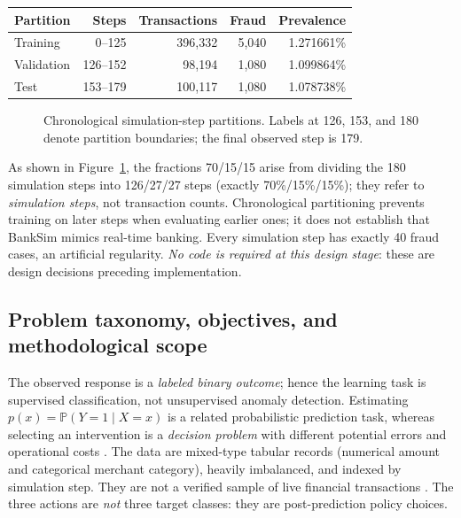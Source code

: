 \documentclass[11pt,a4paper]{article}
\begin{document}
\begin{center}\begin{tabular}{lrrrr}\toprule
Partition & Steps & Transactions & Fraud & Prevalence\\\midrule
Training & 0--125 & 396,332 & 5,040 & 1.271661\%\\
Validation & 126--152 & 98,194 & 1,080 & 1.099864\%\\
Test & 153--179 & 100,117 & 1,080 & 1.078738\%\\\bottomrule
\end{tabular}\end{center}
\begin{figure}[H]\centering
{}
\caption{Chronological simulation-step partitions. Labels at 126, 153, and 180 denote partition boundaries; the final observed step is 179.}\label{fig:timeline}\end{figure}
As shown in Figure~\ref{fig:timeline}, the fractions 70/15/15 arise from dividing the 180 simulation steps into 126/27/27 steps (exactly 70\%/15\%/15\%); they refer to \emph{simulation steps}, not transaction counts. Chronological partitioning prevents training on later steps when evaluating earlier ones; it does not establish that BankSim mimics real-time banking. Every simulation step has exactly 40 fraud cases, an artificial regularity. \emph{No code is required at this design stage}: these are design decisions preceding implementation.


\subsection{Problem taxonomy, objectives, and methodological scope}
The observed response is a \emph{labeled binary outcome}; hence the
learning task is supervised classification, not unsupervised anomaly
detection. Estimating $p(x)=\mathbb P(Y=1\mid X=x)$ is a related
probabilistic prediction task, whereas selecting an intervention is a
\emph{decision problem} with different potential errors and operational
costs \cite{james2023,berger1985}. The data are mixed-type tabular
records (numerical amount and categorical merchant category), heavily
imbalanced, and indexed by simulation step. They are not a verified
sample of live financial transactions \cite{lopezrojas2014}.
The three actions are \emph{not} three target classes: they are
post-prediction policy choices.
\end{document}
